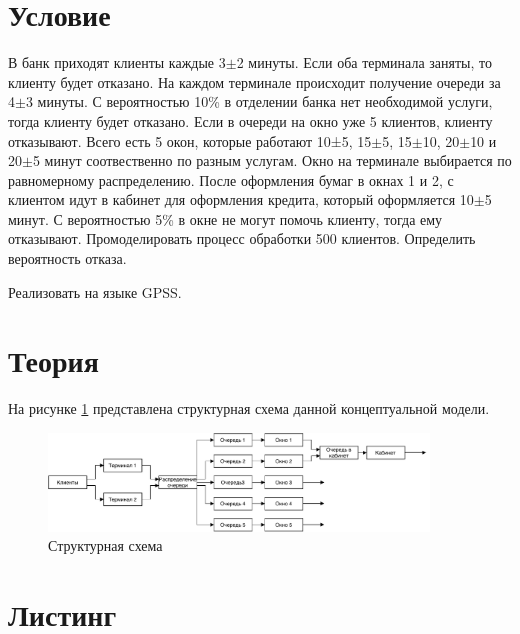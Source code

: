 \section{Условие}

В банк приходят клиенты каждые 3$\pm$2 минуты. Если оба терминала заняты, то клиенту будет отказано. На каждом терминале происходит получение очереди за 4$\pm$3 минуты. С вероятностью 10\% в отделении банка нет необходимой услуги, тогда клиенту будет отказано. Если в очереди на окно уже 5 клиентов, клиенту отказывают. Всего есть 5 окон, которые работают 10±5, 15$\pm$5, 15$\pm$10, 20$\pm$10 и 20$\pm$5 минут соотвественно по разным услугам. Окно на терминале выбирается по равномерному распределению. После оформления бумаг в окнах 1 и 2, с клиентом идут в кабинет для оформления кредита, который оформляется 10$\pm$5 минут. С вероятностью 5\% в окне не могут помочь клиенту, тогда ему отказывают. Промоделировать процесс обработки 500 клиентов. Определить вероятность отказа.

Реализовать на языке GPSS.

\section{Теория}

На рисунке \ref{fig:model} представлена структурная схема  данной концептуальной модели.

\begin{figure}[H]
    \centering
    \includegraphics[width=0.9\textwidth]{img/content/model.pdf}
    \caption{Структурная схема}
    \label{fig:model}
\end{figure}

\section{Листинг}

